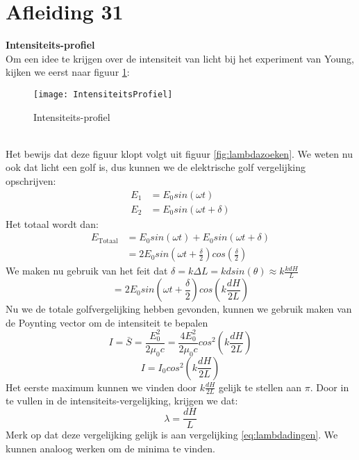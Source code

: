 \documentclass[a4paper,kul]{kulakarticle} %
\begin{document}
\section{Afleiding 31}
\label{sec:intensiteitWrong}
\textbf{Intensiteits-profiel}\\
Om een idee te krijgen over de intensiteit van licht bij het experiment van Young, kijken we eerst naar figuur \ref{fig:intensiteitsprofiel}:
\begin{figure}[!h]
	\centering
	\texttt{[image: IntensiteitsProfiel]}
	\caption[Intensiteits-profiel]{Intensiteits-profiel}
	\label{fig:intensiteitsprofiel}
\end{figure}\\
Het bewijs dat deze figuur klopt volgt uit figuur \ref{fig:lambdazoeken}. We weten nu ook dat licht een golf is, dus kunnen we de elektrische golf vergelijking opschrijven:
\begin{align*}
	E_1&=E_0sin(\omega t)\\
	E_2&=E_0sin(\omega t+\delta)
\end{align*}
Het totaal wordt dan:
\begin{align*}
	E_{\text{Totaal}}&=E_0sin(\omega t)+E_0sin(\omega t+\delta)\\
	&=2E_0sin(\omega t +\frac{\delta}{2})cos(\frac{\delta}{2})
\end{align*}
We maken nu gebruik van het feit dat $\delta = k\Delta L = kdsin(\theta)\approx k\frac{kdH}{L}$
\begin{equation*}
	=2E_0sin(\omega t +\frac{\delta}{2})cos(k\frac{dH}{2L})
\end{equation*}
Nu we de totale golfvergelijking hebben gevonden, kunnen we gebruik maken van de Poynting vector om de intensiteit te bepalen
\begin{equation*}
	I=\bar{S}=\frac{E^2_0}{2\mu_0c}=\frac{4E^2_0}{2\mu_0c}cos^2(k\frac{dH}{2L})
\end{equation*}
\begin{equation*}
	I = I_0cos^2(k\frac{dH}{2L})
\end{equation*}
Het eerste maximum kunnen we vinden door $k\frac{dH}{2L}$ gelijk te stellen aan $\pi$. Door in te vullen in de intensiteits-vergelijking, krijgen we dat:
\begin{equation*}
	\lambda=\frac{dH}{L}
\end{equation*}
Merk op dat deze vergelijking gelijk is aan vergelijking \ref{eq:lambdadingen}. We kunnen analoog werken om de minima te vinden.
\newpage
\end{document}
